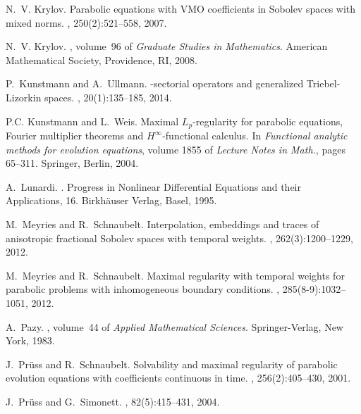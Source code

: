 \documentclass{amsart}
\theoremstyle{plain}
\theoremstyle{remark}
\theoremstyle{plain}
\numberwithin{equation}{section}
\begin{document}
\begin{thebibliography}{10}
N.~V. Krylov.
\newblock Parabolic equations with {VMO} coefficients in {S}obolev spaces with
  mixed norms.
, 250(2):521--558, 2007.

N.~V. Krylov.
, volume~96 of {\em Graduate Studies in Mathematics}.
\newblock American Mathematical Society, Providence, RI, 2008.

P.~Kunstmann and A.~Ullmann.
-sectorial operators and generalized {T}riebel-{L}izorkin
  spaces.
, 20(1):135--185, 2014.

P.C. Kunstmann and L.~Weis.
\newblock Maximal {$L_p$}-regularity for parabolic equations, {F}ourier
  multiplier theorems and {$H^\infty$}-functional calculus.
\newblock In {\em Functional analytic methods for evolution equations}, volume
  1855 of {\em Lecture Notes in Math.}, pages 65--311. Springer, Berlin, 2004.

A.~Lunardi.
.
\newblock Progress in Nonlinear Differential Equations and their Applications,
  16. Birkh\"auser Verlag, Basel, 1995.

M.~Meyries and R.~Schnaubelt.
\newblock Interpolation, embeddings and traces of anisotropic fractional
  {S}obolev spaces with temporal weights.
, 262(3):1200--1229, 2012.

M.~Meyries and R.~Schnaubelt.
\newblock Maximal regularity with temporal weights for parabolic problems with
  inhomogeneous boundary conditions.
, 285(8-9):1032--1051, 2012.

A.~Pazy.
, volume~44 of {\em Applied Mathematical Sciences}.
\newblock Springer-Verlag, New York, 1983.

J.~Pr{\"u}ss and R.~Schnaubelt.
\newblock Solvability and maximal regularity of parabolic evolution equations
  with coefficients continuous in time.
, 256(2):405--430, 2001.

J.~Pr{\"u}ss and G.~Simonett.
, 82(5):415--431, 2004.


\end{thebibliography}
\end{document}

